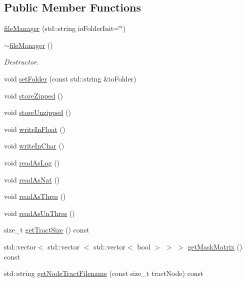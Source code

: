 \subsection*{\-Public \-Member \-Functions}
\begin{DoxyCompactItemize}
\item 
\hyperlink{classfileManager_ab9d80ed58742b8381b3b49f324e37a35}{file\-Manager} (std\-::string io\-Folder\-Init=\char`\"{}\char`\"{})
\item 
\hypertarget{classfileManager_a385e38ba52852423800919ccb084f843}{\hyperlink{classfileManager_a385e38ba52852423800919ccb084f843}{$\sim$file\-Manager} ()}\label{classfileManager_a385e38ba52852423800919ccb084f843}

\begin{DoxyCompactList}\small\item\em \-Destructor. \end{DoxyCompactList}\item 
void \hyperlink{classfileManager_a67527e457000ba63b0271c7f5bd6a61f}{set\-Folder} (const std\-::string \&io\-Folder)
\item 
void \hyperlink{classfileManager_aab7c3fca3510f13d1fad8d23875bf444}{store\-Zipped} ()
\item 
void \hyperlink{classfileManager_af8227012ab3602707592d23a75efb3c3}{store\-Unzipped} ()
\item 
void \hyperlink{classfileManager_a1fa3f0c6c838f5235ab4603f7eaf4aef}{write\-In\-Float} ()
\item 
void \hyperlink{classfileManager_aa8113477a8c33a2f8ef296c3413e7dcd}{write\-In\-Char} ()
\item 
void \hyperlink{classfileManager_a6f05bf73e5d5169ce09591f3dc059ffb}{read\-As\-Log} ()
\item 
void \hyperlink{classfileManager_ac10757ad2d56b087fbbc73afbf3169cf}{read\-As\-Nat} ()
\item 
void \hyperlink{classfileManager_ab6218fede8e71eee369e8a8a0454ee21}{read\-As\-Thres} ()
\item 
void \hyperlink{classfileManager_aa3104aa0287e86101388bf337458d6f4}{read\-As\-Un\-Thres} ()
\item 
size\-\_\-t \hyperlink{classfileManager_a24452e5e2e161dfba62be488d4ecc114}{get\-Tract\-Size} () const 
\item 
std\-::vector$<$ std\-::vector\*
$<$ std\-::vector$<$ bool $>$ $>$ $>$ \hyperlink{classfileManager_ad77404255f7576fdee1ce329369d4f94}{get\-Mask\-Matrix} () const 
\item 
std\-::string \hyperlink{classfileManager_aae49808069aebe457a6be8818488d7c4}{get\-Node\-Tract\-Filename} (const size\-\_\-t tract\-Node) const 

\end{DoxyCompactItemize}
